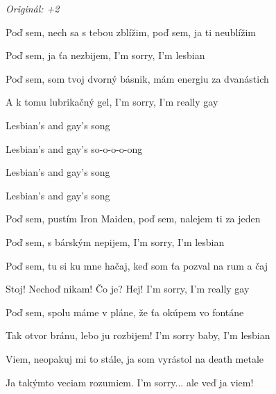 \begin{song}


\begin{headerbox}
 \quad
\textit{Originál: +2}
\end{headerbox}

\begin{hchordbox}
\end{hchordbox}

\Large

\bigskip

 Poď sem, nech sa s tebou zblížim,  poď sem, ja ti neublížim \par
{} Poď sem, ja ťa nezbijem,  I'm sorry, I'm lesbian \par
{} Poď sem, som tvoj dvorný básnik,  mám energiu za dvanástich \par
{} A k tomu lubrikačný gel,  I'm sorry, I'm really gay \par

\bigskip

\begin{chorusbox}{\Refren}
Lesbian's and gay's song \par
{}Lesbian's and gay's so-o-o-o-ong \par
{}Lesbian's and gay's song \par
{}Lesbian's and gay's song \par
\end{chorusbox}

\bigskip

 Poď sem, pustím Iron Maiden,  poď sem, nalejem ti za jeden \par
{} Poď sem, s bárským nepijem,  I'm sorry, I'm lesbian \par
{} Poď sem, tu si ku mne hačaj,  keď som ťa pozval na rum a čaj \par
{} Stoj! Nechoď nikam! Čo je? Hej!  I'm sorry, I'm really gay \par

\bigskip

\Refren

\bigskip

 Poď sem, spolu máme v pláne,  že ťa okúpem vo fontáne \par
{} Tak otvor bránu, lebo ju rozbijem!  I'm sorry baby, I'm lesbian \par
{} Viem, neopakuj mi to stále,  ja som vyrástol na death metale \par
{} Ja takýmto veciam rozumiem.  I'm sorry... ale veď ja viem! \par

\bigskip

\Refren

\end{song}